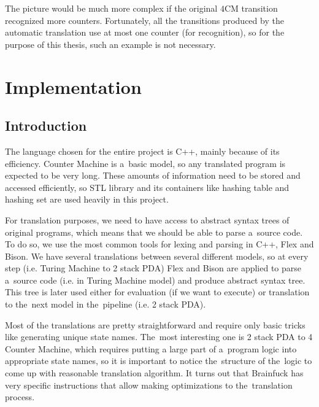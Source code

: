 \documentclass[english,shortabstract,mgr]{iithesis}
\begin{document}
The picture would be much more complex if the original $4$CM transition
recognized more counters. Fortunately, all the transitions produced by
the automatic translation use at most one counter (for recognition),
so for the purpose of this thesis, such an example is not necessary.

\chapter{Implementation}

\section{Introduction}

The language chosen for the entire project is C++, mainly because of its efficiency. Counter Machine
is a~basic model, so any translated program is expected to be very long. These amounts of information
need to be stored and accessed efficiently, so STL library and its containers like hashing table
and hashing set are used heavily in this project.

For translation purposes, we need to have access to abstract syntax trees of original programs, which
means that we should be able to parse a~source code. To do so, we use the most common tools
for lexing and parsing in C++, Flex and Bison. We have several translations
between several different models, so at every step (i.e. Turing Machine to 2 stack PDA) Flex and Bison
are applied to parse a~source code (i.e. in Turing Machine model) and produce abstract syntax tree.
This tree is later used either for evaluation (if we want to execute) or translation to the~next
model in the~pipeline (i.e. 2 stack PDA).

Most of the translations are pretty straightforward and require only basic tricks like
generating unique state names. The~most interesting one is 2 stack PDA to 4 Counter Machine,
which requires putting a large part of a~program logic into appropriate state names, so it is important
to notice the~structure of the~logic to come up with reasonable translation algorithm.
It turns out that Brainfuck has very specific instructions that allow making optimizations
to the~translation process.
\end{document}
